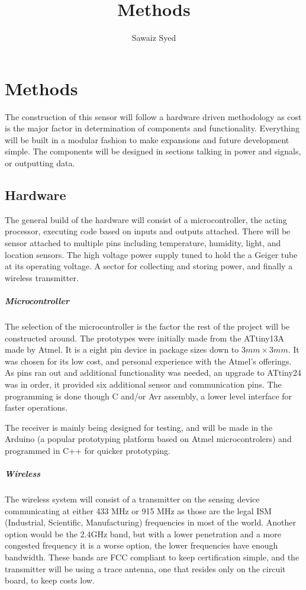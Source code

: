 \documentclass[10pt]{article}
\author{Sawaiz Syed}
\title{Methods}
\begin{document}
\maketitle

\section{Methods}
The construction of this sensor will follow a hardware driven methodology
as cost is the major factor in determination of components and functionality.
Everything will be built in a modular fashion to make expansions and future
development simple. The components will be designed in sections talking in power
and signals, or outputting data. 

\subsection{Hardware}
The general build of the hardware will consist of a microcontroller, the acting 
processor, executing code based on inputs and outputs attached. There will be 
sensor attached to multiple pins including temperature, humidity, light, and 
location sensors. The high voltage power supply tuned to hold the a Geiger 
tube at its operating voltage. A sector for collecting and storing power, and 
finally a wireless transmitter. 

\subparagraph{Microcontroller}
The selection of the microcontroller is the factor the rest of the project
will be constructed around. The prototypes were initially made from the ATtiny13A
made by Atmel. It is a eight pin device in package sizes down to $3mm \times3 mm$. 
It was chosen for its low cost, and personal experience with the Atmel's offerings.
As pins ran out and additional functionality was needed, an upgrade to ATtiny24 was
in order, it provided six additional sensor and communication pins. The programming is
done though C and/or Avr assembly, a lower level interface for faster operations.

The receiver is mainly being designed for testing, and will be made in the Arduino 
(a popular prototyping platform based on Atmel microcontrolers) and programmed in C++ 
for quicker prototyping.

\subparagraph{Wireless}
The wireless system will consist of a transmitter on the sensing device communicating at
either 433 MHz or 915 MHz as those are the legal ISM (Industrial, Scientific, Manufacturing) 
frequencies in most of the world. Another option would be the 2.4GHz band, but with a lower 
penetration and a more congested frequency it is a worse option, the lower frequencies have 
enough bandwidth. These bands are FCC compliant to keep certification simple, and the 
transmitter will be using a trace antenna, one that resides only on the circuit board, to 
keep costs low.
\end{document}
